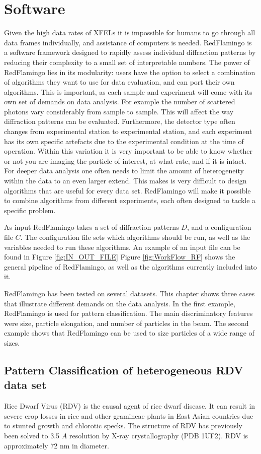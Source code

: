 \section{Software}
Given the high data rates of XFELs it is impossible for humans to go through all data frames individually, and assistance of computers is needed.
RedFlamingo is a software framework designed to rapidly assess individual diffraction patterns by reducing their complexity to a small set of interpretable numbers. The power of RedFlamingo lies in its modularity: users have the option to select a combination of algorithms they want to use for data evaluation, and can port their own algorithms. This is important, as each sample and experiment will come with its own set of demands on data analysis. For example the number of scattered photons vary considerably from sample to sample. This will affect the way diffraction patterns can be evaluated. Furthermore, the detector type often changes from experimental station to experimental station, and each experiment has its own specific artefacts due to the experimental condition at the time of operation. Within this variation it is very important to be able to know whether or not you are imaging the particle of interest, at what rate, and if it is intact. For deeper data analysis one often needs to limit the amount of heterogeneity within the data to an even larger extend. This makes is very difficult to design algorithms that are useful for every data set. RedFlamingo will make it possible to combine algorithms from different experiments, each often designed to tackle a specific problem. 

As input RedFlamingo takes a set of diffraction patterns $D$, and a configuration file $C$. The configuration file sets which algorithms should be run, as well as the variables needed to run these algorithms. An example of an input file can be found in Figure \ref{fig:IN_OUT_FILE} Figure \ref{fig:WorkFlow_RF} shows the general pipeline of RedFlamingo, as well as the algorithms currently included into it.


RedFlamingo has been tested on several datasets. This chapter shows three cases that illustrate different demands on the data analysis. In the first example, RedFlamingo is used for pattern classification. The main discriminatory features were size, particle elongation, and number of particles in the beam. The second example shows that RedFlamingo can be used to size particles of a wide range of sizes.  

\subsection{Pattern Classification of heterogeneous RDV data set}
Rice Dwarf Virus (RDV) is the causal agent of rice dwarf disease. It can result in severe crop losses in rice and other gramineae plants in East Asian countries due to stunted growth and chlorotic specks. The structure of RDV has previously been solved to 3.5 $A$ resolution by X-ray crystallography \cite{Nakagawa2003} (PDB 1UF2). RDV is approximately 72 nm in diameter.

